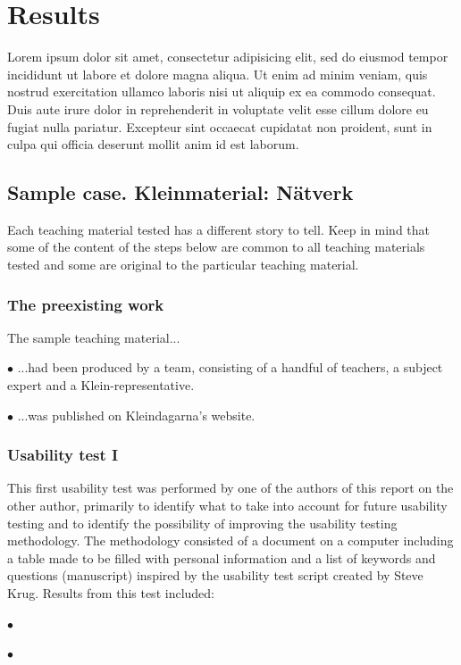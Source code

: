\chapter{Results}
Lorem ipsum dolor sit amet, consectetur adipisicing elit, sed do eiusmod tempor incididunt ut labore et dolore magna aliqua. Ut enim ad minim veniam, quis nostrud exercitation ullamco laboris nisi ut aliquip ex ea commodo consequat. Duis aute irure dolor in reprehenderit in voluptate velit esse cillum dolore eu fugiat nulla pariatur. Excepteur sint occaecat cupidatat non proident, sunt in culpa qui officia deserunt mollit anim id est laborum.

\section{Sample case. Kleinmaterial: Nätverk}
Each teaching material tested has a different story to tell. Keep in mind that some of the content of the steps below are common to all teaching materials tested and some are original to the particular teaching material.

\subsection{The preexisting work}
The sample teaching material...
\begin{description}
    \item $\bullet$ ...had been produced by a team, consisting of a handful of teachers, a subject expert and a Klein-representative.
    \item $\bullet$ ...was published on Kleindagarna's website.
\end{description}

\subsection{Usability test I}
This first usability test was performed by one of the authors of this report on the other author, primarily to identify what to take into account for future usability testing and to identify the possibility of improving the usability testing methodology. The methodology consisted of a document on a computer including a table made to be filled with personal information and a list of keywords and questions (manuscript) inspired by the usability test script created by Steve Krug. Results from this test included:
\begin{description}
    \item $\bullet$
    \item $\bullet$
\end{description}
